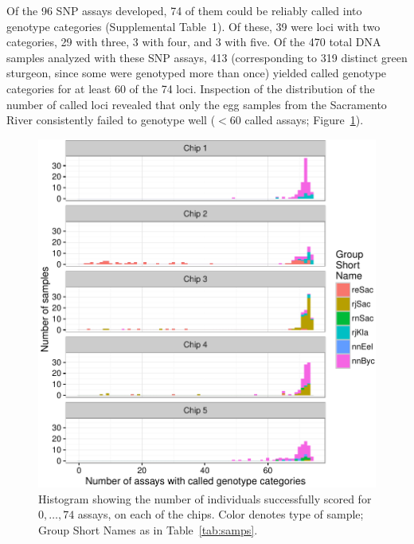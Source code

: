 Of the 96 SNP assays developed, 74 of them could be reliably called into
genotype categories (Supplemental Table~1).  Of these, 39 were loci with two 
categories, 29 with
three, 3 with four, and 3 with five. Of the 470 total DNA samples analyzed with
these SNP assays, 413 (corresponding to 319 distinct green sturgeon, since some
were genotyped more than once) yielded called genotype categories for at least 60
of the 74 loci. Inspection of the distribution of the number of called loci
revealed that only the egg samples from the Sacramento River consistently failed
to genotype well ($<$60 called assays; Figure~\ref{fig:success-histos}).

\begin{figure}
\begin{center}
\includegraphics[width = \linewidth]{inputs/successful-assay-histogram-crop.pdf}
\end{center}
\caption{ Histogram showing the number of individuals
successfully scored for $0,\ldots, 74$ assays, on each of the chips.  Color denotes type of sample; Group Short
Names as in Table~\ref{tab:samps}.  \label{fig:success-histos}}
\end{figure}



